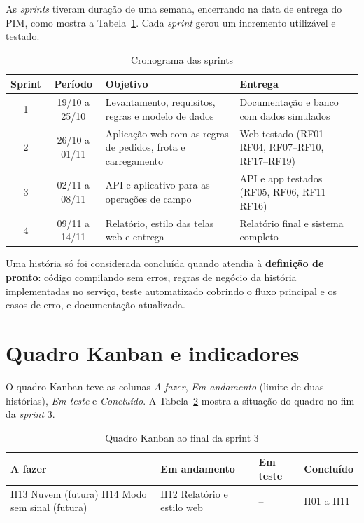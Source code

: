 As \textit{sprints} tiveram duração de uma semana, encerrando na data de entrega do PIM, como mostra a Tabela~\ref{tab:sprints}. Cada \textit{sprint} gerou um incremento utilizável e testado.

\begin{table}[htbp]
\centering
\caption{Cronograma das sprints}
\label{tab:sprints}
\footnotesize
\begin{tabular}{|c|c|p{6cm}|p{5cm}|}
\hline
\textbf{Sprint} & \textbf{Período} & \textbf{Objetivo} & \textbf{Entrega} \\ \hline
1 & 19/10 a 25/10 & Levantamento, requisitos, regras e modelo de dados & Documentação e banco com dados simulados \\ \hline
2 & 26/10 a 01/11 & Aplicação web com as regras de pedidos, frota e carregamento & Web testado (RF01--RF04, RF07--RF10, RF17--RF19) \\ \hline
3 & 02/11 a 08/11 & API e aplicativo para as operações de campo & API e app testados (RF05, RF06, RF11--RF16) \\ \hline
4 & 09/11 a 14/11 & Relatório, estilo das telas web e entrega & Relatório final e sistema completo \\ \hline
\end{tabular}
\end{table}

Uma história só foi considerada concluída quando atendia à \textbf{definição de pronto}: código compilando sem erros, regras de negócio da história implementadas no serviço, teste automatizado cobrindo o fluxo principal e os casos de erro, e documentação atualizada.

\section{Quadro Kanban e indicadores}

O quadro Kanban teve as colunas \textit{A fazer}, \textit{Em andamento} (limite de duas histórias), \textit{Em teste} e \textit{Concluído}. A Tabela~\ref{tab:kanban} mostra a situação do quadro no fim da \textit{sprint} 3.

\begin{table}[htbp]
\centering
\caption{Quadro Kanban ao final da sprint 3}
\label{tab:kanban}
\footnotesize
\begin{tabular}{|p{3.4cm}|p{3.4cm}|p{3.4cm}|p{3.4cm}|}
\hline
\textbf{A fazer} & \textbf{Em andamento} & \textbf{Em teste} & \textbf{Concluído} \\ \hline
H13 Nuvem (futura) \newline H14 Modo sem sinal (futura) & H12 Relatório e estilo web & -- & H01 a H11 \\ \hline
\end{tabular}
\end{table}


